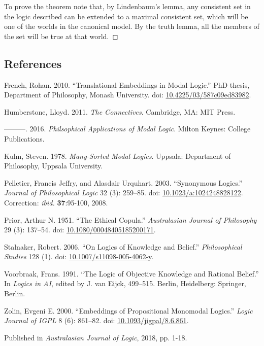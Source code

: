 \documentclass[
  11pt,
  letterpaper,
  DIV=11,
  numbers=noendperiod,
  twoside]{scrartcl}
\newlength{\cslhangindent}
\newenvironment{CSLReferences}[2] %
 {\begin{list}{}{%
  \setlength{\itemindent}{0pt}
  \setlength{\leftmargin}{0pt}
  \setlength{\parsep}{0pt}
  \ifodd #1
   \setlength{\leftmargin}{\cslhangindent}
   \setlength{\itemindent}{-1\cslhangindent}
  \fi
  \setlength{\itemsep}{#2\baselineskip}}}
 {\end{list}}
\begin{document}
To prove the theorem note that, by Lindenbaum's lemma, any consistent
set in the logic described can be extended to a maximal consistent set,
which will be one of the worlds in the canonical model. By the truth
lemma, all the members of the set will be true at that world.~◻

\subsection*{References}\label{references}

\label{refs}
\begin{CSLReferences}{1}{0}
French, Rohan. 2010. {``Translational Embeddings in Modal Logic.''} PhD
thesis, Department of Philosophy, Monash University. doi:
\href{https://doi.org/10.4225/03/587c09ed83982}{10.4225/03/587c09ed83982}.

Humberstone, Lloyd. 2011. \emph{The Connectives}. Cambridge, MA: MIT
Press.

---------. 2016. \emph{Philsophical Applications of Modal Logic}. Milton
Keynes: College Publications.

Kuhn, Steven. 1978. \emph{Many-Sorted Modal Logics}. Uppsala: Department
of Philosophy, Uppsala University.

Pelletier, Francis Jeffry, and Alasdair Urquhart. 2003. {``Synonymous
Logics.''} \emph{Journal of Philosophical Logic} 32 (3): 259--85. doi:
\href{https://doi.org/10.1023/a:1024248828122}{10.1023/a:1024248828122}.
Correction: \emph{ibid.} \textbf{37}:95-100, 2008.

Prior, Arthur N. 1951. {``The Ethical Copula.''} \emph{Australasian
Journal of Philosophy} 29 (3): 137--54. doi:
\href{https://doi.org/10.1080/00048405185200171}{10.1080/00048405185200171}.

Stalnaker, Robert. 2006. {``{On Logics of Knowledge and Belief}.''}
\emph{Philosophical Studies} 128 (1). doi:
\href{https://doi.org/10.1007/s11098-005-4062-y}{10.1007/s11098-005-4062-y}.

Voorbraak, Frans. 1991. {``The Logic of Objective Knowledge and Rational
Belief.''} In \emph{Logics in {AI}}, edited by J. van Eijck, 499--515.
Berlin, Heidelberg: Springer, Berlin.

Zolin, Evgeni E. 2000. {``Embeddings of Propositional Monomodal
Logics.''} \emph{Logic Journal of IGPL} 8 (6): 861--82. doi:
\href{https://doi.org/10.1093/jigpal/8.6.861}{10.1093/jigpal/8.6.861}.

\end{CSLReferences}



\noindent Published in\emph{
Australasian Journal of Logic}, 2018, pp. 1-18.
\end{document}
